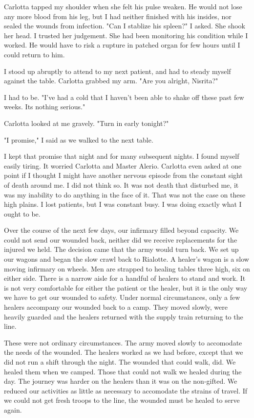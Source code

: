 \documentclass{article}
\begin{document}
Carlotta tapped my shoulder when she felt his pulse weaken. He would not lose any more blood from his leg, but I had neither finished with his insides, nor sealed the wounds from infection. "Can I stablize his spleen?" I asked. She shook her head. I trusted her judgement. She had been monitoring his condition while I worked. He would have to risk a rupture in patched organ for few hours until I could  return to him.

I stood up abruptly to attend to my next patient, and had to steady myself against the table. Carlotta grabbed my arm. "Are you alright, Nisrita?" 

I had to be. "I've had a cold that I haven't been able to shake off these past few weeks. Its nothing serious." 

Carlotta looked at me gravely. "Turn in early tonight?"

"I promise," I said as we walked to the next table.

I kept that promise that night and for many subsequent nights. I found myself easily tiring. It worried Carlotta and Master Alerio. Carlotta even asked at one point if I thought I might have another nervous episode from the constant sight of death around me. I did not think so. It was not death that disturbed me, it was my inability to do anything in the face of it. That was not the case on these high plains. I lost patients, but I was constant busy. I was doing exactly what I ought to be. 

Over the course of the next few days, our infirmary filled beyond capacity. We could not send our wounded back, neither did we receive replacements for the injured we held. The decision came that the army would turn back. We set up our wagons and began the slow crawl back to Rialotte. A healer's wagon is a slow moving infirmary on wheels. Men are strapped to healing tables three high, six on either side. There is a narrow aisle for a handful of healers to stand and work. It is not very comfortable for either the patient or the healer, but it is the only way we have to get our wounded to safety. Under normal circumstances, only a few healers accompany our wounded back to a camp. They moved slowly, were heavily guarded and the healers returned with the supply train returning to the line. 

These were not ordinary circumstances. The army moved slowly to accomodate the needs of the wounded. The healers worked as we had before, except that we did not run a shift through the night. The wounded that could walk, did. We healed them when we camped. Those that could not walk we healed during the day. The journey was harder on the healers than it was on the non-gifted. We reduced our activities as little as necessary to accomodate the strains of travel. If we could not get fresh troops to the line, the wounded must be healed to serve again. 
\end{document}
